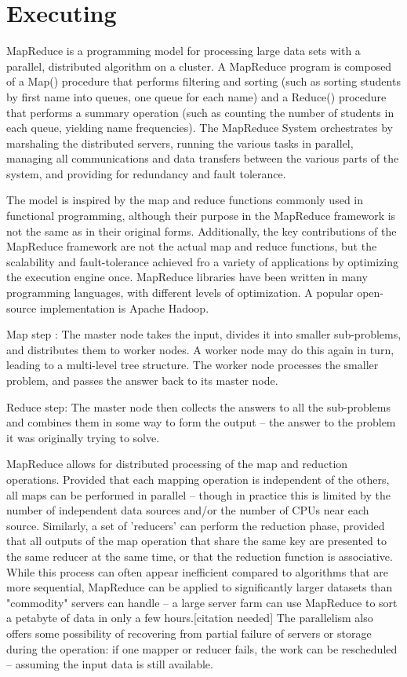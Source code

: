 \documentclass{article} %
\begin{document}
\section{Executing}
MapReduce is a programming model for processing large data sets with a parallel, distributed algorithm on a cluster. A MapReduce program is composed of a Map() procedure that performs filtering and sorting (such as sorting students by first name into queues, one queue for each name) and a Reduce() procedure that performs a summary operation (such as counting the number of students in each queue, yielding name frequencies). The MapReduce System orchestrates by marshaling the distributed servers, running the various tasks in parallel, managing all communications and data transfers between the various parts of the system, and providing for redundancy and fault tolerance.

	The model is inspired by the map and reduce functions commonly used in functional programming, although their purpose in the MapReduce framework is not the same as in their original forms. Additionally, the key contributions of the MapReduce framework are not the actual map and reduce functions, but the scalability and fault-tolerance achieved fro a variety of applications by optimizing the execution engine once. MapReduce libraries have been written in many programming languages, with different levels of optimization. A popular open-source implementation is Apache Hadoop.

	Map step : The master node takes the input, divides it into smaller sub-problems, and distributes them to worker nodes. A worker node may do this again in turn, leading to a multi-level tree structure. The worker node processes the smaller problem, and passes the answer back to its master node.

	Reduce step: The master node then collects the answers to all the sub-problems and combines them in some way to form the output – the answer to the problem it was originally trying to solve.

	MapReduce allows for distributed processing of the map and reduction operations. Provided that each mapping operation is independent of the others, all maps can be performed in parallel – though in practice this is limited by the number of independent data sources and/or the number of CPUs near each source. Similarly, a set of 'reducers' can perform the reduction phase, provided that all outputs of the map operation that share the same key are presented to the same reducer at the same time, or that the reduction function is associative. While this process can often appear inefficient compared to algorithms that are more sequential, MapReduce can be applied to significantly larger datasets than "commodity" servers can handle – a large server farm can use MapReduce to sort a petabyte of data in only a few hours.[citation needed] The parallelism also offers some possibility of recovering from partial failure of servers or storage during the operation: if one mapper or reducer fails, the work can be rescheduled – assuming the input data is still available.
\end{document}
